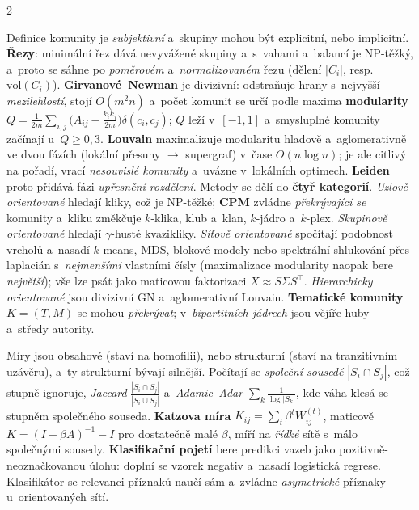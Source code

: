 \documentclass[10pt,a4paper]{article}
\newcommand{\hh}[1]{\par\smallskip\noindent{\bfseries\color{headcol}#1}\par\nobreak\vspace{-0.2em}}
\newcommand{\tm}[1]{\textbf{#1}}
\begin{document}
\begin{multicols}{2}
\hh{Detekce komunit}
Definice komunity je \emph{subjektivní} a~skupiny mohou být explicitní, nebo implicitní.
\tm{Řezy}: minimální řez dává nevyvážené skupiny a~s~vahami a~balancí je NP-těžký, a~proto se
sáhne po \emph{poměrovém} a~\emph{normalizovaném} řezu (dělení $|C_i|$, resp.\
$\mathrm{vol}(C_i)$).
\tm{Girvanové--Newman} je divizivní: odstraňuje hrany s~nejvyšší \emph{mezilehlostí}, stojí
$O(m^2n)$ a~počet komunit se určí podle maxima \tm{modularity}
$Q=\frac{1}{2m}\sum_{i,j}\bigl(A_{ij}-\frac{k_ik_j}{2m}\bigr)\delta(c_i,c_j)$;
$Q$ leží v~$[-1,1]$ a~smysluplné komunity začínají u~$Q\ge 0{,}3$.
\tm{Louvain} maximalizuje modularitu hladově a~aglomerativně ve dvou fázích (lokální přesuny
$\to$ supergraf) v~čase $O(n\log n)$; je ale citlivý na pořadí, vrací \emph{nesouvislé
komunity} a~uvázne v~lokálních optimech. \tm{Leiden} proto přidává fázi \emph{upřesnění
rozdělení}.
Metody se dělí do \tm{čtyř kategorií}. \emph{Uzlově orientované} hledají kliky, což je
NP-těžké; \tm{CPM} zvládne \emph{překrývající se} komunity a~kliku změkčuje $k$-klika, klub
a~klan, $k$-jádro a~$k$-plex. \emph{Skupinově orientované} hledají $\gamma$-husté kvazikliky.
\emph{Síťově orientované} spočítají podobnost vrcholů a~nasadí $k$-means, MDS, blokové modely
nebo spektrální shlukování přes laplacián s~\emph{nejmenšími} vlastními čísly (maximalizace
modularity naopak bere \emph{největší}); vše lze psát jako maticovou faktorizaci
$X\approx S\Sigma S^{\!\top}$. \emph{Hierarchicky orientované} jsou divizivní GN
a~aglomerativní Louvain.
\tm{Tematické komunity} $K=(T,M)$ se mohou \emph{překrývat}; v~\emph{bipartitních jádrech} jsou
vějíře huby a~středy autority.

\hh{Predikce vazeb}
Míry jsou obsahové (staví na homofilii), nebo strukturní (staví na tranzitivním uzávěru), a~ty
strukturní bývají silnější. Počítají se \emph{společní sousedé} $|S_i\cap S_j|$, což stupně
ignoruje, \emph{Jaccard} $\frac{|S_i\cap S_j|}{|S_i\cup S_j|}$ a~\emph{Adamic--Adar}
$\sum_k \frac{1}{\log|S_k|}$, kde váha klesá se stupněm společného souseda.
\tm{Katzova míra} $K_{ij}=\sum_t \beta^t W^{(t)}_{ij}$, maticově $K=(I-\beta A)^{-1}-I$ pro
dostatečně malé $\beta$, míří na \emph{řídké} sítě s~málo společnými sousedy.
\tm{Klasifikační pojetí} bere predikci vazeb jako pozitivně-neoznačkovanou úlohu: doplní se
vzorek negativ a~nasadí logistická regrese. Klasifikátor se relevanci příznaků naučí sám
a~zvládne \emph{asymetrické} příznaky u~orientovaných sítí.

\end{multicols}
\newpage
\end{document}
